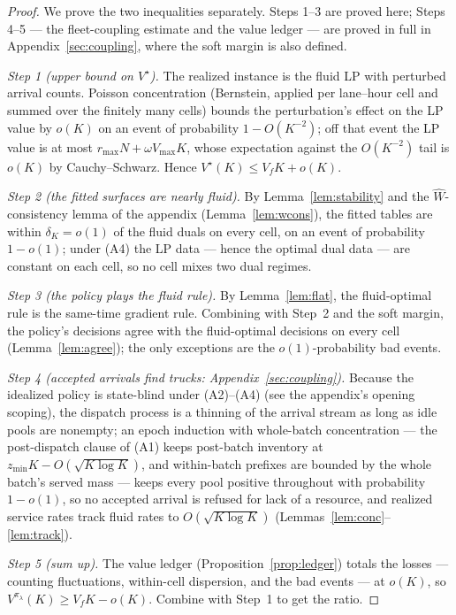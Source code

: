 \documentclass[11pt]{article}
\newcommand{\Vstar}{V^{\star}}
\newcommand{\pol}{\pi_{\lambda}}
\begin{document}
\begin{proof}
We prove the two inequalities separately. Steps 1--3 are proved
here; Steps 4--5 --- the fleet-coupling estimate and the value ledger
--- are proved in full in Appendix~\ref{sec:coupling}, where the soft
margin is also defined.

\emph{Step 1 (upper bound on $\Vstar$).} The realized instance is the
fluid LP with perturbed arrival counts. Poisson concentration
(Bernstein, applied per lane--hour cell and summed over the finitely
many cells) bounds the perturbation's effect on the LP value by
$o(K)$ on an event of probability $1 - O(K^{-2})$; off that event the
LP value is at most $r_{\max} N + \omega V_{\max} K$, whose
expectation against the $O(K^{-2})$ tail is $o(K)$ by
Cauchy--Schwarz. Hence $\Vstar(K) \leq V_f K + o(K)$.

\emph{Step 2 (the fitted surfaces are nearly fluid).} By
Lemma~\ref{lem:stability} and the $\widehat{W}$-consistency lemma of
the appendix (Lemma~\ref{lem:wcons}), the fitted tables are within
$\delta_K = o(1)$ of the fluid duals on every cell, on an event of
probability $1 - o(1)$; under (A4) the LP data --- hence the
optimal dual data --- are constant on each cell, so no cell mixes two
dual regimes.

\emph{Step 3 (the policy plays the fluid rule).} By
Lemma~\ref{lem:flat}, the fluid-optimal rule is the same-time gradient
rule. Combining with Step~2 and the soft margin, the policy's
decisions agree with the fluid-optimal decisions on every cell
(Lemma~\ref{lem:agree}); the only exceptions are the
$o(1)$-probability bad events.

\emph{Step 4 (accepted arrivals find trucks:
Appendix~\ref{sec:coupling}).} Because the idealized policy is
state-blind under (A2)--(A4) (see the appendix's opening scoping),
the dispatch process is a thinning of the arrival stream as long as
idle pools are nonempty; an epoch induction with whole-batch
concentration --- the post-dispatch clause of (A1) keeps post-batch
inventory at $z_{\min} K - O(\sqrt{K \log K})$, and within-batch
prefixes are bounded by the whole batch's served mass --- keeps every
pool positive throughout with probability $1 - o(1)$, so no
accepted arrival is refused for lack of a resource, and realized
service rates track fluid rates to $O(\sqrt{K \log K})$
(Lemmas~\ref{lem:conc}--\ref{lem:track}).

\emph{Step 5 (sum up).} The value ledger
(Proposition~\ref{prop:ledger}) totals the losses --- counting
fluctuations, within-cell dispersion, and the bad events --- at
$o(K)$, so $V^{\pol}(K) \geq V_f K - o(K)$. Combine with Step~1 to
get the ratio.
\end{proof}
\end{document}
